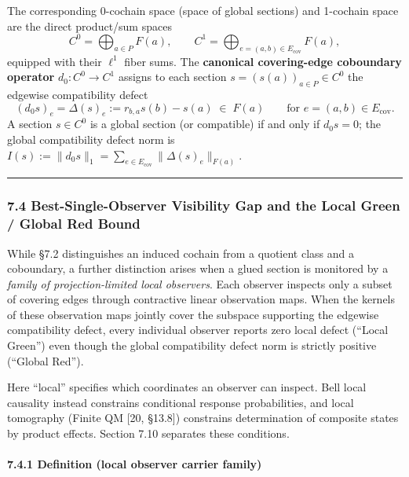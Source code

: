 \documentclass[
  11pt,
]{article}
\begin{document}
The corresponding 0-cochain space (space of global sections) and 1-cochain space are the direct product/sum spaces
\[
C^0 = \bigoplus_{a\in P} F(a), \qquad C^1 = \bigoplus_{e=(a,b)\in E_{\mathrm{cov}}} F(a),
\]
equipped with their \(\ell^1\) fiber sums. The \textbf{canonical covering-edge coboundary operator} \(d_0: C^0 \to C^1\) assigns to each section \(s = (s(a))_{a\in P} \in C^0\) the edgewise compatibility defect
\[
(d_0 s)_e = \Delta(s)_e := r_{b,a}s(b) - s(a) \;\in\; F(a) \qquad \text{for } e=(a,b)\in E_{\mathrm{cov}}.
\]
A section \(s \in C^0\) is a global section (or compatible) if and only if \(d_0 s = 0\); the global compatibility defect norm is \(I(s) := \lVert d_0 s\rVert_1 = \sum_{e\in E_{\mathrm{cov}}} \lVert\Delta(s)_e\rVert_{F(a)}\).

\begin{center}\rule{0.5\linewidth}{0.5pt}\end{center}

\subsubsection{7.4 Best-Single-Observer Visibility Gap and the Local Green / Global Red Bound}\label{best-single-observer-visibility-gap-and-the-local-green-global-red-bound}

While §7.2 distinguishes an induced cochain from a quotient class and a coboundary, a further distinction arises when a glued section is monitored by a \emph{family of projection-limited local observers}. Each observer inspects only a subset of covering edges through contractive linear observation maps. When the kernels of these observation maps jointly cover the subspace supporting the edgewise compatibility defect, every individual observer reports zero local defect (``Local Green'') even though the global compatibility defect norm is strictly positive (``Global Red'').

Here ``local'' specifies which coordinates an observer can inspect. Bell
local causality instead constrains conditional response probabilities,
and local tomography (Finite QM {[}20, §13.8{]}) constrains determination of composite
states by product effects. Section 7.10 separates these conditions.

\paragraph{7.4.1 Definition (local observer carrier family)}\label{definition-local-observer-carrier-family}
\end{document}
